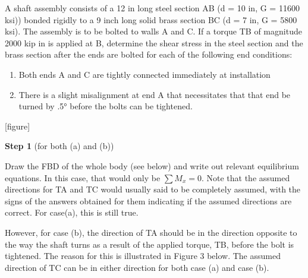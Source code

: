 \documentclass[
  letterpaper,
  DIV=11,
  numbers=noendperiod]{scrreprt}
\providecommand{\tightlist}{%
  \setlength{\itemsep}{0pt}\setlength{\parskip}{0pt}}\usepackage{longtable,booktabs,array}
\begin{document}
\begin{tcolorbox}[enhanced jigsaw, breakable, opacityback=0, toptitle=1mm, left=2mm, colback=white, opacitybacktitle=0.6, colframe=quarto-callout-note-color-frame, titlerule=0mm, arc=.35mm, leftrule=.75mm, bottomtitle=1mm, colbacktitle=quarto-callout-note-color!10!white, rightrule=.15mm, title={Example 6.4: Needs title}, bottomrule=.15mm, toprule=.15mm, coltitle=black]

A shaft assembly consists of a 12 in long steel section AB (d = 10 in, G
= 11600 ksi)) bonded rigidly to a 9 inch long solid brass section BC (d
= 7 in, G = 5800 ksi). The assembly is to be bolted to walls A and C. If
a torque TB of magnitude 2000 kip in is applied at B, determine the
shear stress in the steel section and the brass section after the ends
are bolted for each of the following end conditions:

\begin{enumerate}
\def\labelenumi{\arabic{enumi}.}
\tightlist
\item
  Both ends A and C are tightly connected immediately at installation
\item
  There is a slight misalignment at end A that necessitates that that
  end be turned by .5° before the bolts can be tightened.
\end{enumerate}

{[}figure{]}

\begin{tcolorbox}[enhanced jigsaw, breakable, opacityback=0, toptitle=1mm, left=2mm, colback=white, opacitybacktitle=0.6, colframe=quarto-callout-note-color-frame, titlerule=0mm, arc=.35mm, leftrule=.75mm, bottomtitle=1mm, colbacktitle=quarto-callout-note-color!10!white, rightrule=.15mm, title={Solution}, bottomrule=.15mm, toprule=.15mm, coltitle=black]

\textbf{Step 1} (for both (a) and (b))

Draw the FBD of the whole body (see below) and write out relevant
equilibrium equations. In this case, that would only be \(\sum M_x=0\).
Note that the assumed directions for TA and TC would usually said to be
completely assumed, with the signs of the answers obtained for them
indicating if the assumed directions are correct. For case(a), this is
still true.

However, for case (b), the direction of TA should be in the direction
opposite to the way the shaft turns as a result of the applied torque,
TB, before the bolt is tightened. The reason for this is illustrated in
Figure 3 below. The assumed direction of TC can be in either direction
for both case (a) and case (b).


\end{tcolorbox}
\end{tcolorbox}
\end{document}

